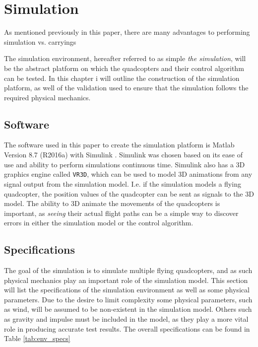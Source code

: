 
\chapter{Simulation}
\label{chap:simulation}
As mentioned previously in this paper, there are many advantages to performing simulation vs. carryings 


The simulation environment, hereafter referred to as simple \textit{the simulation}, will be the abstract platform on which the quadcopters and their control algorithm can be tested. 
In this chapter i will outline the construction of the simulation platform, as well of the validation used to ensure that the simulation follows the required physical mechanics. 

\section{Software}
The software used in this paper to create the simulation platform is Matlab Version 8.7 (R2016a) with Simulink \cite{_matlab_2016}. Simulink was chosen based on its ease of use and ability to perform simulations continuous time. Simulink also has a 3D graphics engine called \texttt{VR3D}\cite{_matlab_2016}, which can be used to model 3D animations from any signal output from the simulation model. I.e. if the simulation models a flying quadcopter, the position values of the quadcopter can be sent as signals to the 3D model. The ability to 3D animate the movements of the quadcopters is important, as \textit{seeing} their actual flight paths can be a simple way to discover errors in either the simulation model or the control algorithm. 

\section{Specifications}
\label{sec:physics}

The goal of the simulation is to simulate multiple flying quadcopters, and as such physical mechanics play an important role of the simulation model. This section will list the specifications of the simulation environment as well as some physical parameters. Due to the desire to limit complexity some physical parameters, such as wind, will be assumed to be non-existent in the simulation model. Others such as gravity and impulse must be included in the model, as they play a more vital role in producing accurate test results. The overall specifications can be found in Table \ref{tab:env_specs}

